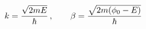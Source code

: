 \documentclass[preview]{standalone}
\begin{document}
\begin{align*}
\special{dvisvgm:raw <g id='unique000'>}k=\frac{\sqrt{2mE}}{\hbar}\,,\qquad \special{dvisvgm:raw </g>}\special{dvisvgm:raw <g id='unique001'>}\beta=\frac{\sqrt{2m(\phi_0-E)}}{\hbar}\special{dvisvgm:raw </g>}
\end{align*}
\end{document}
